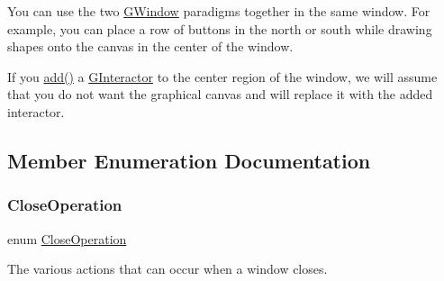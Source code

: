 You can use the two \mbox{\hyperlink{classGWindow}{G\+Window}} paradigms together in the same window. For example, you can place a row of buttons in the north or south while drawing shapes onto the canvas in the center of the window.

If you \mbox{\hyperlink{classGWindow_a6f99b7c841256dbdc5acaafbbca4e685}{add()}} a \mbox{\hyperlink{classGInteractor}{G\+Interactor}} to the center region of the window, we will assume that you do not want the graphical canvas and will replace it with the added interactor. 

\subsection{Member Enumeration Documentation}
\mbox{\label{classGWindow_a84803201f0f9569db61f51cac9e0d2d2}} 
\subsubsection{\texorpdfstring{Close\+Operation}{CloseOperation}}
{\footnotesize\ttfamily enum \mbox{\hyperlink{classGWindow_a84803201f0f9569db61f51cac9e0d2d2}{Close\+Operation}}}



The various actions that can occur when a window closes. 

